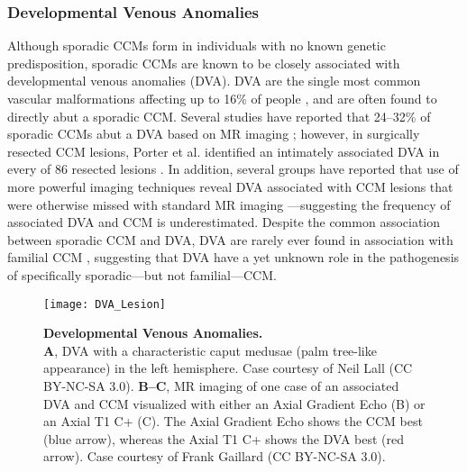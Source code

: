 \subsubsection{Developmental Venous Anomalies}
Although sporadic CCMs form in individuals with no known genetic predisposition, sporadic CCMs are known to be closely associated with developmental venous anomalies (DVA). DVA are the single most common vascular malformations affecting up to 16\% of people \citep{brinjikji2017}, and are often found to directly abut a sporadic CCM. Several studies have reported that 24--32\% of sporadic CCMs abut a DVA based on MR imaging \citep{abdulrauf1999, wurm2005, porter1999}; however, in surgically resected CCM lesions, Porter et al. identified an intimately associated DVA in every of 86 resected lesions \citep{porter1999}. In addition, several groups have reported that use of more powerful imaging techniques reveal DVA associated with CCM lesions that were otherwise missed with standard MR imaging \citep{dammann2017, kamezawa2005}---suggesting the frequency of associated DVA and CCM is underestimated. Despite the common association between sporadic CCM and DVA, DVA are rarely ever found in association with familial CCM \citep{petersen2010}, suggesting that DVA have a yet unknown role in the pathogenesis of specifically sporadic---but not familial---CCM.

\begin{figure}[tbp!]
\begin{center}
\texttt{[image: DVA\_Lesion]}
\end{center}
\caption[Developmental Venous Anomalies] {\textbf{Developmental Venous Anomalies.} \\ \textbf{A},  DVA with a characteristic caput medusae (palm tree-like appearance) in the left hemisphere. Case courtesy of Neil Lall (CC BY-NC-SA 3.0). \textbf{B--C}, MR imaging of one case of an associated DVA and CCM visualized with either an Axial Gradient Echo (B) or an Axial T1 C+ (C). The Axial Gradient Echo shows the CCM best (blue arrow), whereas the Axial T1 C+ shows the DVA best (red arrow). Case courtesy of Frank Gaillard (CC BY-NC-SA 3.0).}


\label{DVA_Lesion}
\end{figure}

